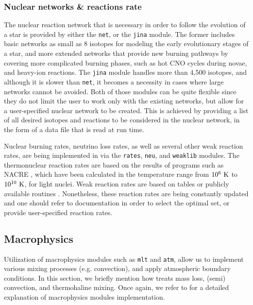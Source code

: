 \documentclass[../../main/thesis_msc.tex]{subfiles}
\begin{document}
				\subsubsection{Nuclear networks \& reactions rate}
					The nuclear reaction network that is necessary in order to follow the evolution of a star is provided by either the \texttt{net}, or the \texttt{jina} module. The former includes basic networks as small as 8 isotopes for modeling the early evolutionary stages of a star, and more extended networks that provide new burning pathways by covering more complicated burning phases, such as hot CNO cycles during novae, and heavy-ion reactions. The \texttt{jina} module handles more than 4,500 isotopes, and although it is slower than \texttt{net}, it becomes a necessity in cases where large networks cannot be avoided. Both of those modules can be quite flexible since they do not limit the user to work only with the existing networks, but allow for a user-specified nuclear network to be created. This is achieved by providing a list of all desired isotopes and reactions to be considered in the nuclear network, in the form of a data file that is read at run time.
					
					Nuclear burning rates, neutrino loss rates, as well as several other weak reaction rates, are being implemented in \mesa via the \texttt{rates}, \texttt{neu}, and \texttt{weaklib} modules. The thermonuclear reaction rates are based on the results of programs such as \textsc{NACRE} \citep[Nuclear Astrophysics Compilation of REaction rates][]{nacre}, which have been calculated in the temperature range from $\rm 10^6 \ K$ to $\rm 10^{10} \ K$, for light nuclei. Weak reaction rates are based on tables or publicly available routines \citep[e.g.][]{itoh1996}. Nonetheless, these reaction rates are being constantly updated and one should refer to \mesa documentation in order to select the optimal set, or provide user-specified reaction rates.
					
					
					
			\subsection{Macrophysics}
				Utilization of macrophysics modules such as \texttt{mlt} and \texttt{atm}, allow us to implement various mixing processes (e.g. convection), and apply atmospheric boundary conditions. In this section, we briefly mention how \mesa treats mass loss, (semi) convection, and thermohaline mixing. Once again, we refer to \cite{Paxton2011} for a detailed explanation of macrophysics modules implementation.
			
\end{document}
